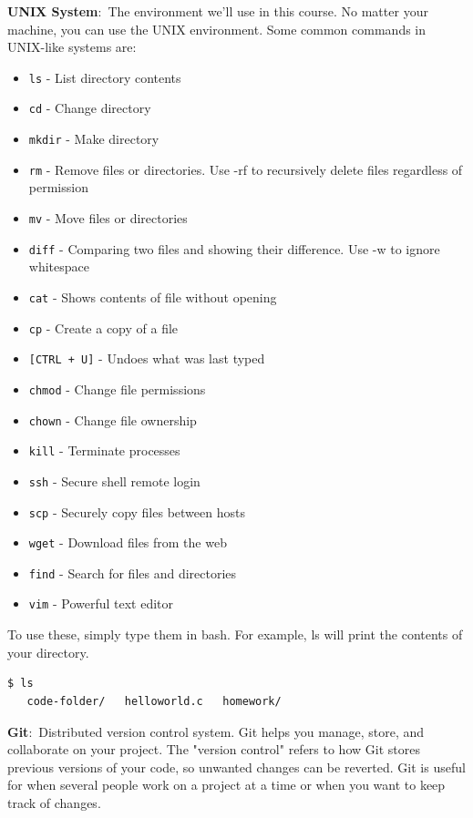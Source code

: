 \documentclass[nobib]{tufte-handout}
\newcommand{\defn}[2]{\noindent\textbf{#1}:\ #2}
\begin{document}
\defn{UNIX System}{The environment we'll use in this course.}
No matter your machine, you can use the UNIX environment. 
Some common commands in UNIX-like systems are:
\begin{itemize}
   \item \texttt{ls} - List directory contents
   \item \texttt{cd} - Change directory
   \item \texttt{mkdir} - Make directory
   \item \texttt{rm} - Remove files or directories. Use -rf to recursively delete files regardless of permission
   \item \texttt{mv} - Move files or directories
   \item \texttt{diff} - Comparing two files and showing their difference. Use -w to ignore whitespace
   \item \texttt{cat} - Shows contents of file without opening
   \item \texttt{cp} - Create a copy of a file
   \item \texttt{[CTRL + U]} - Undoes what was last typed
   \item \texttt{chmod} - Change file permissions
   \item \texttt{chown} - Change file ownership
   \item \texttt{kill} - Terminate processes
   \item \texttt{ssh} - Secure shell remote login
   \item \texttt{scp} - Securely copy files between hosts
   \item \texttt{wget} - Download files from the web
   \item \texttt{find} - Search for files and directories
   \item \texttt{vim} - Powerful text editor
\end{itemize}

\noindent To use these, simply type them in bash. For example, ls
will print the contents of your directory. 

\begin{lstlisting}[language=bash,caption=Using ls]
   $ ls
   code-folder/   helloworld.c   homework/
\end{lstlisting}

\defn{Git}{Distributed version control system.} Git 
helps you manage, store, and collaborate on your project. The 
"version control" refers to how Git stores previous versions
of your code, so unwanted changes can be reverted. Git is useful
for when several people work on a project at a time or when you want
to keep track of changes.  
\end{document}
